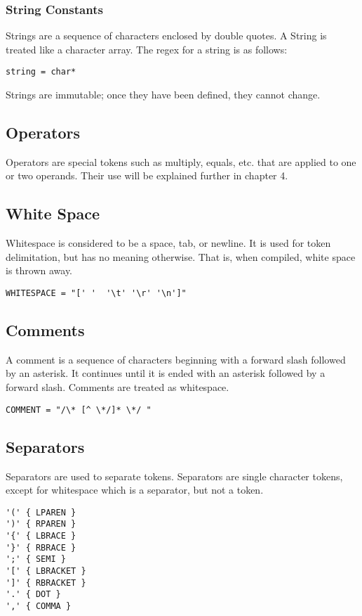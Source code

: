 \documentclass{article}
\begin{document}
\subsubsection{String Constants}
Strings are a sequence of characters enclosed by double quotes. A String is treated like a character array. The regex for a string is as follows:

\begin{Verbatim}[frame=single]
string = char*
\end{Verbatim}
Strings are immutable; once they have been defined, they cannot change.

\subsection{Operators}
Operators are special tokens such as multiply, equals, etc. that are applied to one or two operands.  Their use will be explained further in chapter 4.

\subsection{White Space}
Whitespace is considered to be a space, tab, or newline. It is used for token delimitation, but has no meaning otherwise. That is, when compiled, white space is thrown away.

\begin{Verbatim}[frame=single]
WHITESPACE = "[' '  '\t' '\r' '\n']"
\end{Verbatim}

\subsection{Comments}
A comment is a sequence of characters beginning with a forward slash followed by an asterisk. It continues until it is ended with an asterisk followed by a forward slash. Comments are treated as whitespace. 
\begin{Verbatim}[frame=single]
COMMENT = "/\* [^ \*/]* \*/ "
\end{Verbatim}

\subsection{Separators}
Separators are used to separate tokens. Separators are single character tokens, except for whitespace which is a separator, but not a token. 
\begin{Verbatim}[frame=single]
'('	{ LPAREN }
')'	{ RPAREN }
'{'	{ LBRACE }
'}'	{ RBRACE }
';'	{ SEMI }
'['	{ LBRACKET }
']'	{ RBRACKET }
'.'	{ DOT }
','	{ COMMA }
\end{Verbatim}
\end{document}
